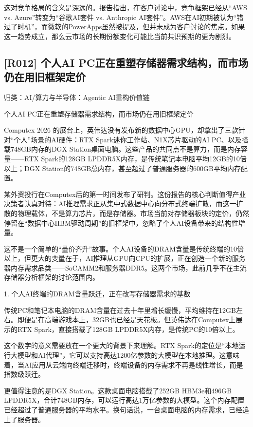 \documentclass[11pt]{ctexart}
\begin{document}
这对竞争格局的含义是深远的。报告指出，在客户讨论中，竞争框架已经从“AWS vs. Azure”转变为“谷歌AI套件 vs. Anthropic AI套件”。AWS在AI初期被认为“错过了时机”，而微软的PowerApps虽然被提及，但并未成为客户讨论的焦点。如果这一趋势成立，那么云市场的长期份额变化可能比当前共识预期的更为剧烈。

\subsection{[R012] 个人AI PC正在重塑存储器需求结构，而市场仍在用旧框架定价}
{\small\color{refgray}归类：AI/算力与半导体：Agentic AI重构价值链}

个人AI PC正在重塑存储器需求结构，而市场仍在用旧框架定价

Computex 2026 的展台上，英伟达没有发布新的数据中心GPU，却拿出了三款针对“个人”场景的AI硬件：RTX Spark迷你工作站、N1X芯片驱动的AI PC、以及搭载748GB内存的DGX Station桌面电脑。这些产品的共同点不是算力，而是内存容量——RTX Spark的128GB LPDDR5X内存，是传统笔记本电脑平均12GB的10倍以上；DGX Station的748GB总内存，甚至超过了普通服务器的600GB平均内存配置。

某外资投行在Computex后的第一时间发布了研判。这份报告的核心判断值得产业决策者认真对待：AI推理需求正从集中式数据中心向分布式终端扩散，而这一扩散的物理载体，不是算力芯片，而是存储器。市场当前对存储器板块的定价，仍然停留在“数据中心HBM驱动周期”的旧框架中，忽略了个人AI设备带来的结构性增量。

这不是一个简单的“量价齐升”故事。个人AI设备的DRAM含量是传统终端的10倍以上，但更大的变量在于，AI推理从GPU向CPU的扩展，正在创造一个新的服务器内存需求品类——SoCAMM2和服务器DDR5。这两个市场，此前几乎不在主流存储器分析框架的讨论范围内。

1. 个人AI终端的DRAM含量跃迁，正在改写存储器需求的基数

传统PC和笔记本电脑的DRAM含量在过去十年里增长缓慢，平均维持在12GB左右。即便是在高端游戏本上，32GB也已经是天花板。但英伟达在Computex上展示的RTX Spark，直接搭载了128GB LPDDR5X内存，是传统PC的10倍以上。

这个数字的意义需要放在一个更大的背景下来理解。RTX Spark的定位是“本地运行大模型和AI代理”，它可以支持高达1200亿参数的大模型在本地推理。这意味着，当AI应用从云端向终端迁移时，终端设备的内存需求不再是线性增长，而是指数级跃迁。

更值得注意的是DGX Station。这款桌面电脑搭载了252GB HBM3e和496GB LPDDR5X，合计748GB内存，可以运行高达1万亿参数的大模型。这个内存配置已经超过了普通服务器的平均水平。换句话说，一台桌面电脑的内存需求，已经追上了服务器。
\end{document}
